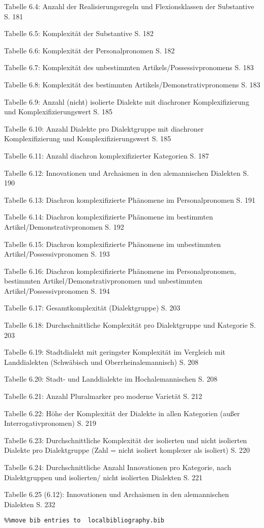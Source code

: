 Tabelle 6.4: Anzahl der Realisierungsregeln und Flexionsklassen der Substantive  S. 181

Tabelle 6.5: Komplexität der Substantive  S. 182

Tabelle 6.6: Komplexität der Personalpronomen  S. 182

Tabelle 6.7: Komplexität des unbestimmten Artikels/Possessivpronomens  S. 183

Tabelle 6.8: Komplexität des bestimmten Artikels/Demonstrativpronomens  S. 183

Tabelle 6.9: Anzahl (nicht) isolierte Dialekte mit diachroner Komplexifizierung und Komplexifizierungswert  S. 185

Tabelle 6.10: Anzahl Dialekte pro Dialektgruppe mit diachroner Komplexifizierung und Komplexifizierungswert  S. 185

Tabelle 6.11: Anzahl diachron komplexifizierter Kategorien  S. 187

Tabelle 6.12: Innovationen und Archaismen in den alemannischen Dialekten  S. 190

Tabelle 6.13: Diachron komplexifizierte Phänomene im Personalpronomen  S. 191

Tabelle 6.14: Diachron komplexifizierte Phänomene im bestimmten Artikel/Demonstrativpronomen  S. 192

Tabelle 6.15: Diachron komplexifizierte Phänomene im unbestimmten Artikel/Possessivpronomen  S. 193

Tabelle 6.16: Diachron komplexifizierte Phänomene im Personalpronomen, bestimmten Artikel/Demonstrativpronomen und unbestimmten Artikel/Possessivpronomen  S. 194

Tabelle 6.17: Gesamtkomplexität (Dialektgruppe)  S. 203

Tabelle 6.18: Durchschnittliche Komplexität pro Dialektgruppe und Kategorie  S. 203

Tabelle 6.19: Stadtdialekt mit geringster Komplexität im Vergleich mit Landdialekten (Schwäbisch und Oberrheinalemannisch)  S. 208

Tabelle 6.20: Stadt- und Landdialekte im Hochalemannischen  S. 208

Tabelle 6.21: Anzahl Pluralmarker pro moderne Varietät  S. 212

Tabelle 6.22: Höhe der Komplexität der Dialekte in allen Kategorien (außer Interrogativpronomen)  S. 219

Tabelle 6.23: Durchschnittliche Komplexität der isolierten und nicht isolierten Dialekte pro Dialektgruppe (Zahl = nicht isoliert komplexer als isoliert)  S. 220

Tabelle 6.24: Durchschnittliche Anzahl Innovationen pro Kategorie, nach Dialektgruppen und isolierten/ nicht isolierten Dialekten  S. 221

Tabelle 6.25 (6.12): Innovationen und Archaismen in den alemannischen Dialekten  S. 232


\begin{verbatim}%%move bib entries to  localbibliography.bib
\end{verbatim}